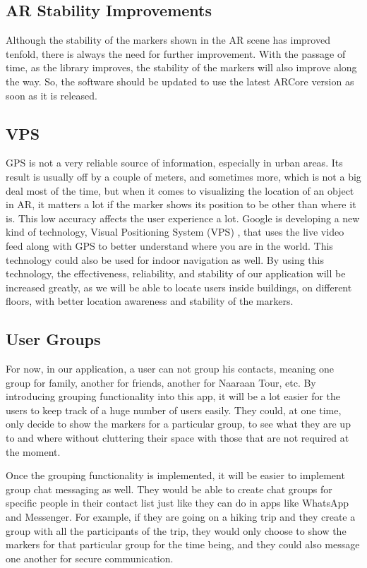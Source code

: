 \subsection{AR Stability Improvements}
Although the stability of the markers shown in the AR scene has improved tenfold, there is always the need for further improvement. With the passage of time, as the library improves, the stability of the markers will also improve along the way. So, the software should be updated to use the latest ARCore version as soon as it is released.

\subsection{VPS}
GPS is not a very reliable source of information, especially in urban areas. Its result is usually off by a couple of meters, and sometimes more, which is not a big deal most of the time, but when it comes to visualizing the location of an object in AR, it matters a lot if the marker shows its position to be other than where it is. This low accuracy affects the user experience a lot. Google is developing a new kind of technology, Visual Positioning System (VPS) \cite{GoogleVPS2018}, that uses the live video feed along with GPS to better understand where you are in the world. This technology could also be used for indoor navigation as well. By using this technology, the effectiveness, reliability, and stability of our application will be increased greatly, as we will be able to locate users inside buildings, on different floors, with better location awareness and stability of the markers.

\subsection{User Groups}
For now, in our application, a user can not group his contacts, meaning one group for family, another for friends, another for Naaraan Tour, etc. By introducing grouping functionality into this app, it will be a lot easier for the users to keep track of a huge number of users easily. They could, at one time, only decide to show the markers for a particular group, to see what they are up to and where without cluttering their space with those that are not required at the moment. 


Once the grouping functionality is implemented, it will be easier to implement group chat messaging as well. They would be able to create chat groups for specific people in their contact list just like they can do in apps like WhatsApp and Messenger. For example, if they are going on a hiking trip and they create a group with all the participants of the trip, they would only choose to show the markers for that particular group for the time being, and they could also message one another for secure communication.

